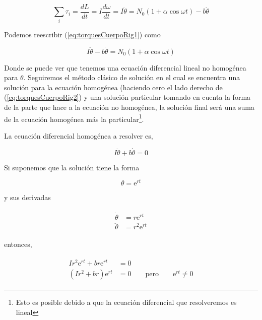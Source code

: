 \documentclass[a4paper,10pt]{article}
\newcommand{\euler}{\mathrm{e}}
\begin{document}
\begin{equation}
 \sum_i \tau_i = \frac{dL}{dt} = I \frac{d\omega}{dt} = I \ddot{\theta} 
 = N_0(1+\alpha \cos{\omega t}) - b\dot{\theta}
 \label{eq:torquesCuerpoRig1}
\end{equation}

Podemos reescribir (\ref{eq:torquesCuerpoRig1}) como

\begin{equation}
 I\ddot{\theta} - b\dot{\theta} = N_0(1+\alpha \cos{\omega t})
 \label{eq:torquesCuerpoRig2}
\end{equation}

Donde se puede ver que tenemos una ecuación diferencial lineal no homogénea
para $\theta$. Seguiremos el método clásico de solución en el cual se encuentra
una solución para la ecuación homogénea (haciendo cero el lado derecho de
(\ref{eq:torquesCuerpoRig2}) y una solución particular tomando en cuenta 
la forma de la parte que hace a la ecuación no homogénea, la solución final 
será una suma de la ecuación homogénea más la particular\footnote{Esto es posible
debido a que la ecuación diferencial que resolveremos es lineal}.

\vspace{.3cm}

La ecuación diferencial homogénea a resolver es,

\begin{equation}
 I\ddot{\theta} + b\dot{\theta} = 0
 \label{eq:helixHomog1}
\end{equation}

Si suponemos que la solución tiene la forma 

$$\theta = \euler^{rt}$$

y sus derivadas

\begin{align*}
 \begin{split}
%  
  \dot{\theta} &= r\euler^{rt} \\
  \ddot{\theta} &= r^2\euler^{rt}  
%
 \end{split}
\end{align*}


entonces,

\begin{align*}
 \begin{split}
%  
  Ir^2\euler^{rt} + br\euler^{rt} &= 0 \\
  (Ir^2+br)\euler^{rt} &= 0 \qquad \text{pero} \qquad \euler^{rt} \neq 0
%
 \end{split}
\end{align*}
\end{document}
